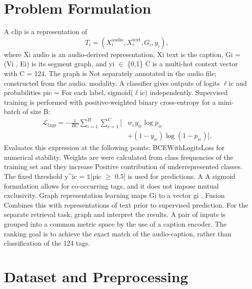 \documentclass[10pt,twocolumn,letterpaper]{article}
\begin{document}
\section{Problem Formulation}
A clip is a representation of
\begin{equation}
T_i=(X_i^{\mathrm{audio}},X_i^{\mathrm{text}},G_i,y_i),
\end{equation}
where Xi audio is an audio-derived representation, Xi text is the caption, Gi = (Vi , Ei) is its segment graph, and yi $\in$ \{0,1\} C is a multi-hot context vector with C = 124. The graph is Not separately annotated in the audio file; constructed from the audio. modality. A classifier gives outputs of logits $\ell$ic and probabilities pic = For each label, sigmoid($\ell$ic) independently. Supervised training is performed with positive-weighted binary cross-entropy for a mini-batch of size B:
\begin{equation}
\begin{aligned}
\mathcal{L}_{\mathrm{tags}}=-\frac{1}{BC}\sum_{i=1}^{B}\sum_{c=1}^{C}
\big[&w_c y_{ic}\log p_{ic}\\
&+(1-y_{ic})\log(1-p_{ic})\big].
\end{aligned}
\label{eq:bce}
\end{equation}
Evaluates this expression at the following points: BCEWithLogitsLoss for numerical stability. Weights are were calculated from class frequencies of the training set and they increase Positive contribution of underrepresented classes. The fixed threshold y\textasciicircum{}ic = $\mathbb{1}$[pic $\geq$ 0.5] is used for predictions. A A sigmoid formulation allows for co-occurring tags, and it does not impose mutual exclusivity. Graph representation learning maps Gi to a vector gi . Fusion Combines this with representations of text prior to supervised prediction. For the separate retrieval task, graph and interpret the results. A pair of inputs is grouped into a common metric space by the use of a caption encoder. The ranking goal is to achieve the exact match of the audio-caption, rather than classification of the 124 tags.

\section{Dataset and Preprocessing}
\end{document}
